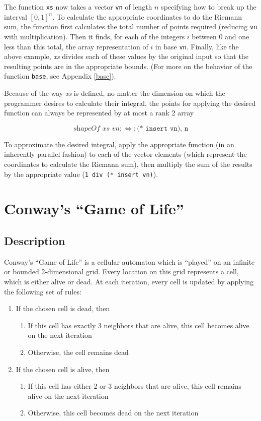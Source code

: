 The function \texttt{xs} now takes a vector \texttt{vn} of length $n$ 
specifying how to break up the interval $[0,1]^n$.
To calculate the appropriate coordinates to do the Riemann sum, 
the function first calculates the total number of points required (reducing \texttt{vn} with multiplication). 
Then it finds, for each of the integers $i$ between 0 and one less than this total, 
the array representation of $i$ in base \texttt{vn}. 
Finally, like the above example, \textit{xs} divides each of these values by the original input 
so that the resulting points are in the appropriate bounds.
(For more on the behavior of the function \texttt{base}, see Appendix \ref{base}). %

Because of the way \textit{xs} is defined, no matter the dimension on which the programmer desires to calculate their integral, 
the points for applying the desired function can always be represented by at most a rank 2 array 

\[\textit{shapeOf xs vn} ; \Leftrightarrow ; \texttt{(* insert vn), n} \]

To approximate the desired integral, apply the appropriate function (in an inherently parallel fashion) 
to each of the vector elements (which represent the coordinates to calculate the Riemann sum), 
then multiply the sum of the results by the appropriate value (\texttt{1 div (* insert vn)}).

\section{Conway's ``Game of Life''}
\subsection{Description}
Conway's ``Game of Life''\cite{gol} is a cellular automaton which is ``played'' on an infinite or bounded 2-dimensional grid. 
Every location on this grid represents a cell, which is either alive or dead. 
At each iteration, every cell is updated by applying the following set of rules:

\begin{enumerate}
	\item If the chosen cell is dead, then
	\begin{enumerate}
		\item If this cell has exactly 3 neighbors that are alive, 
			this cell becomes alive on the next iteration
		\item Otherwise, the cell remains dead
	\end{enumerate}
	\item If the chosen cell is alive, then
	\begin{enumerate}
		\item If this cell has either 2 or 3 neighbors that are alive, 
			this cell remains alive on the next iteration
		\item Otherwise, this cell becomes dead on the next iteration
	\end{enumerate}
\end{enumerate}

